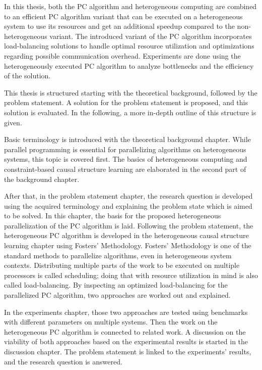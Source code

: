 In this thesis, both the PC algorithm and heterogeneous computing are combined to an efficient PC algorithm variant that can be executed on a heterogeneous system to use its resources and get an additional speedup compared to the non-heterogeneous variant. The introduced variant of the PC algorithm incorporates load-balancing solutions to handle optimal resource utilization and optimizations regarding possible communication overhead. Experiments are done using the heterogeneously executed PC algorithm to analyze bottlenecks and the efficiency of the solution.

This thesis is structured starting with the theoretical background, followed by the problem statement. A solution for the problem statement is proposed, and this solution is evaluated. In the following, a more in-depth outline of this structure is given.

Basic terminology is introduced with the theoretical background chapter. While parallel programming is essential for parallelizing algorithms on heterogeneous systems, this topic is covered first. The basics of heterogeneous computing and constraint-based causal structure learning are elaborated in the second part of the background chapter.

After that, in the problem statement chapter, the research question is developed using the acquired terminology and explaining the problem state which is aimed to be solved. In this chapter, the basis for the proposed heterogeneous parallelization of the PC algorithm is laid. Following the problem statement, the heterogeneous PC algorithm is developed in the heterogeneous causal structure learning chapter using Fosters' Methodology. Fosters' Methodology is one of the standard methods to parallelize algorithms, even in heterogeneous system contexts. Distributing multiple parts of the work to be executed on multiple processors is called scheduling; doing that with resource utilization in mind is also called load-balancing. By inspecting an optimized load-balancing for the parallelized PC algorithm, two approaches are worked out and explained.

In the experiments chapter, those two approaches are tested using benchmarks with different parameters on multiple systems. Then the work on the heterogeneous PC algorithm is connected to related work. A discussion on the viability of both approaches based on the experimental results is started in the discussion chapter. The problem statement is linked to the experiments' results, and the research question is answered.


